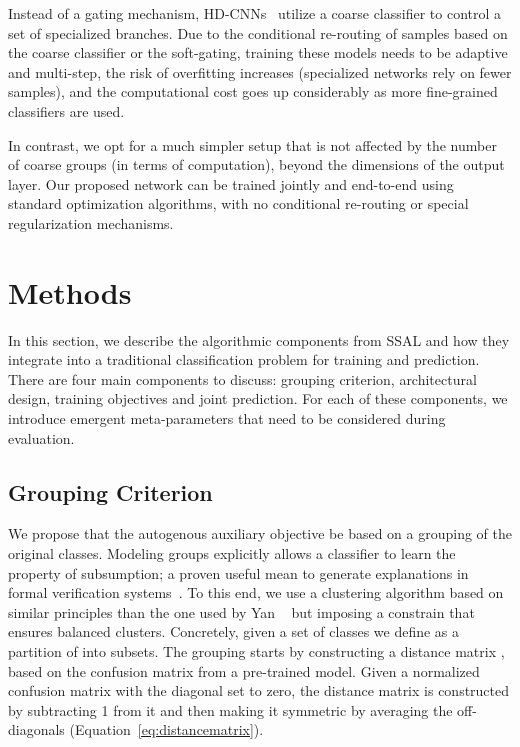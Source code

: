\documentclass[10pt,twocolumn,letterpaper]{article}
\begin{document}
Instead of a gating mechanism, HD-CNNs~\cite{yan2015hd} utilize a coarse classifier to control a set of specialized branches.
Due to the conditional re-routing of samples based on the coarse classifier or the soft-gating, training these models needs to be adaptive and multi-step, the risk of overfitting increases (specialized networks rely on fewer samples), and the computational cost goes up considerably as more fine-grained classifiers are used.

In contrast, we opt for a much simpler setup that is not affected by the number of coarse groups (in terms of computation), beyond the dimensions of the output layer.
Our proposed network can be trained jointly and end-to-end using standard optimization algorithms, with no conditional re-routing or special regularization mechanisms.




\section{Methods}
\label{sec:methods}

In this section, we describe the algorithmic components from SSAL and how they integrate into a traditional classification problem for training and prediction.
There are four main components to discuss: grouping criterion, architectural design, training objectives and joint prediction.
For each of these components, we introduce emergent meta-parameters that need to be considered during evaluation.

\subsection{Grouping Criterion}
\label{subsec:grouping}
We propose that the autogenous auxiliary objective be based on a grouping of the original classes.
Modeling groups explicitly allows a classifier to learn the property of subsumption; a proven useful mean to generate explanations in formal verification systems~\cite{mcguinness1995explaining}.
To this end, we use a clustering algorithm based on similar principles than the one used by Yan \etal~\cite{yan2015hd} but imposing a constrain that ensures balanced clusters.
Concretely, given a set of classes  we define  as a partition of  into  subsets.
The grouping starts by constructing a distance matrix , based on the confusion matrix from a pre-trained model.
Given a normalized confusion matrix  with the diagonal set to zero, the distance matrix  is constructed by subtracting 1 from it and then making it symmetric by averaging the off-diagonals (Equation~\ref{eq:distancematrix}).
\end{document}
